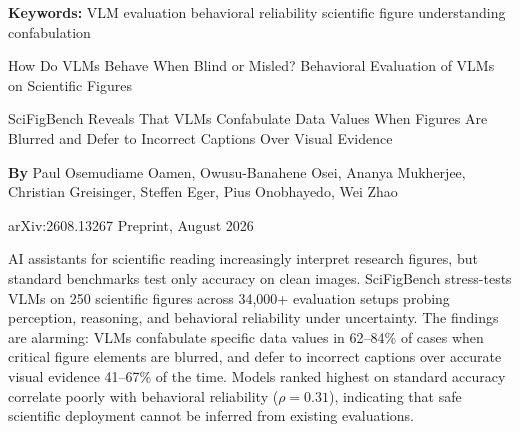 \documentclass[10pt,twocolumn]{article}
\begin{document}
\setlength{\parindent}{0pt}
\setlength{\parskip}{4pt}

{\small\color{keywordgray}\textbf{Keywords:}
  VLM evaluation \textbullet{}
  behavioral reliability \textbullet{}
  scientific figure understanding \textbullet{}
  confabulation}\par\vspace{4pt}

{\LARGE\bfseries\raggedright
  How Do VLMs Behave When Blind or Misled?
  Behavioral Evaluation of VLMs on Scientific
  Figures}\par\vspace{4pt}

{\large\itshape\raggedright
  SciFigBench Reveals That VLMs Confabulate Data Values When Figures
  Are Blurred and Defer to Incorrect Captions Over Visual
  Evidence}\par\vspace{6pt}

{\small\textbf{By} Paul Osemudiame Oamen, Owusu-Banahene Osei,
  Ananya Mukherjee, Christian Greisinger, Steffen Eger,
  Pius Onobhayedo, Wei Zhao}\par\vspace{2pt}

{\small\color{keywordgray}arXiv:2608.13267 \textbullet{} Preprint, August 2026}
\par\vspace{2pt}\noindent{\color{rulered}\rule{\columnwidth}{0.6pt}}\vspace{6pt}

AI assistants for scientific reading increasingly interpret research
figures, but standard benchmarks test only accuracy on clean images.
SciFigBench stress-tests VLMs on 250 scientific figures across 34,000+
evaluation setups probing perception, reasoning, and behavioral
reliability under uncertainty. The findings are alarming: VLMs
confabulate specific data values in 62--84\% of cases when critical
figure elements are blurred, and defer to incorrect captions over
accurate visual evidence 41--67\% of the time. Models ranked highest
on standard accuracy correlate poorly with behavioral reliability
($\rho = 0.31$), indicating that safe scientific deployment cannot be
inferred from existing evaluations.
\end{document}
